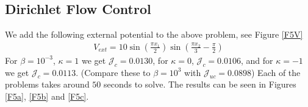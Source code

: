 \documentclass[11pt, a4paper]{article}
\theoremstyle{definition}
\begin{document}
	\subsection{Dirichlet Flow Control}
	We add the following external potential to the above problem, see Figure \ref{F5V} 
	\begin{align*}
		V_{ext} = 10\sin\left(\frac{\pi x_1}{2}\right) \sin\left(\frac{\pi x_2}{3} - \frac{\pi}{2}\right)
	\end{align*}
	For $\beta = 10^{-3}$, $\kappa = 1$ we get $\mathcal J_c = 0.0130$, for $\kappa = 0$, $\mathcal J_c = 0.0106$, and for $\kappa = - 1$ we get $\mathcal J_c = 0.0113$. (Compare these to $\beta = 10^3$ with $\mathcal J_{uc} = 0.0898$) Each of the problems takes around $50$ seconds to solve. The results can be seen in Figures \ref{F5a}, \ref{F5b} and \ref{F5c}.
	
\end{document}
